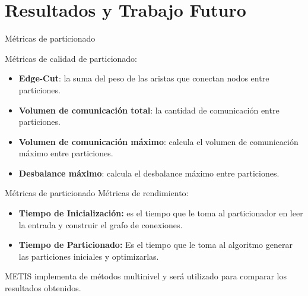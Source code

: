 \section{Resultados y Trabajo Futuro}
\graphicspath{ {./conclusions/} }

\begin{frame}{Métricas de particionado}

Métricas de calidad de particionado:

\begin{itemize}
    \item \textbf{Edge-Cut}: la suma del peso de las aristas que conectan nodos entre particiones.

    \item \textbf{Volumen de comunicación total}: la cantidad de comunicación entre particiones.

    \item \textbf{Volumen de comunicación máximo}: calcula el volumen de comunicación máximo entre particiones.

    \item \textbf{Desbalance máximo}: calcula el desbalance máximo entre particiones.
\end{itemize}

\end{frame}


\begin{frame}{Métricas de particionado}
Métricas de rendimiento:

\begin{itemize}
    \item{\textbf{Tiempo de Inicialización:}} es el tiempo que le toma al particionador en leer la entrada y
    construir el grafo de conexiones.

    \item{\textbf{Tiempo de Particionado:}} Es el tiempo que le toma al
    algoritmo generar las particiones iniciales y optimizarlas.
\end{itemize}

\vspace{1em}

METIS implementa de métodos multinivel y será utilizado para comparar los resultados obtenidos.
\end{frame}


